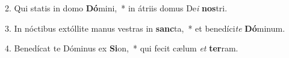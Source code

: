 2. Qui statis in domo \textbf{Dó}mini,~*  in átriis domus De\textit{i} \textbf{nos}tri.\

3. In nóctibus extóllite manus vestras in \textbf{sanc}ta,~*  et benedíci\textit{te} \textbf{Dó}minum.\

4. Benedícat te Dóminus ex \textbf{Si}on,~*  qui fecit cælum \textit{et} \textbf{ter}ram.\

